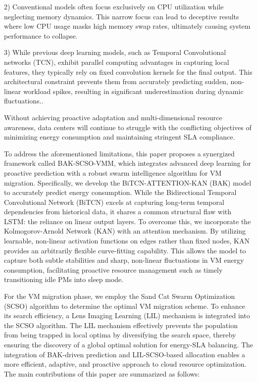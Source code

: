 \documentclass[conference]{{IEEEtran}}
\begin{document}
2) Conventional models often focus exclusively on CPU utilization while neglecting memory dynamics\cite{lou2025hybrid}\cite{mondal2024multi}. This narrow focus can lead to deceptive results where low CPU usage masks high memory swap rates, ultimately causing system performance to collapse. 

3) While previous deep learning models, such as Temporal Convolutional networks (TCN), exhibit parallel computing advantages in capturing local features, they typically rely on fixed convolution kernels for the final output. This architectural constraint prevents them from accurately predicting sudden, non-linear workload spikes, resulting in significant underestimation during dynamic fluctuations..

Without achieving proactive adaptation and multi-dimensional resource awareness, data centers will continue to struggle with the conflicting objectives of minimizing energy consumption and maintaining stringent SLA compliance.

To address the aforementioned limitations, this paper proposes a synergized framework called BAK-SCSO-VMM, which integrates advanced deep learning for proactive prediction with a robust swarm intelligence algorithm for VM migration. Specifically, we develop the BiTCN-ATTENTION-KAN (BAK) model to accurately predict  energy consumption\cite{chua2024building}. While the Bidirectional Temporal Convolutional Network (BiTCN) excels at capturing long-term temporal dependencies from historical data\cite{paul2024optimizing}, it shares a common structural flaw with LSTM: the reliance on linear output layers. To overcome this, we incorporate the Kolmogorov-Arnold Network (KAN) with an attention mechanism. By utilizing learnable, non-linear activation functions on edges rather than fixed nodes, KAN provides an arbitrarily flexible curve-fitting capability. This allows the model to capture both subtle stabilities and sharp, non-linear fluctuations in VM energy consumption, facilitating proactive resource management such as timely transitioning idle PMs into sleep mode\cite{bresson2024kagnns}\cite{mondal2024multi}.

For the VM migration phase, we employ the Sand Cat Swarm Optimization (SCSO) algorithm to determine the optimal VM migration scheme\cite{ajmera2024dynamic}. To enhance its search efficiency, a Lens Imaging Learning (LIL) mechanism is integrated into the SCSO algorithm. The LIL mechanism effectively prevents the population from being trapped in local optima by diversifying the search space, thereby ensuring the discovery of a global optimal solution for energy-SLA balancing\cite{yang2025cam}. The integration of BAK-driven prediction and LIL-SCSO-based allocation enables a more efficient, adaptive, and proactive approach to cloud resource optimization. The main contributions of this paper are summarized as follows:
\end{document}
